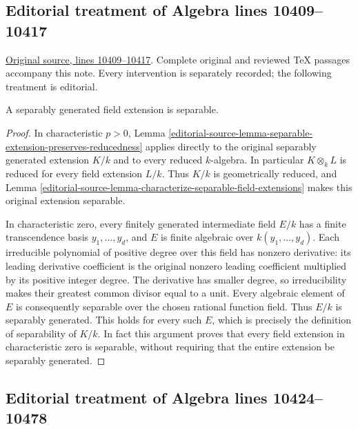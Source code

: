 \subsection{Editorial treatment of Algebra lines 10409--10417}

\hypertarget{algebra-context-122}{}

\noindent\href{https://github.com/stacks/stacks-project/blob/a04446e57ec1fbc252a871afcec7752fb2807b14/algebra.tex\#L10409}{Original source, lines 10409--10417}. Complete original and reviewed TeX passages accompany this note. Every intervention is separately recorded; the following treatment is editorial.


\begin{lemma}
\label{editorial-source-lemma-separably-generated-separable}
A separably generated field extension is separable.
\end{lemma}

\begin{proof}
In characteristic $p>0$, Lemma
\ref{editorial-source-lemma-separable-extension-preserves-reducedness}
applies directly to the original separably generated
extension $K/k$ and to every reduced $k$-algebra.
In particular $K\otimes_k L$ is reduced for every
field extension $L/k$. Thus $K/k$ is geometrically
reduced, and Lemma
\ref{editorial-source-lemma-characterize-separable-field-extensions}
makes this original extension separable.

In characteristic zero, every finitely generated
intermediate field $E/k$ has a finite transcendence
basis $y_1,\ldots,y_d$, and $E$ is finite algebraic
over $k(y_1,\ldots,y_d)$. Each irreducible polynomial
of positive degree over this field has nonzero
derivative: its leading derivative coefficient is
the original nonzero leading coefficient multiplied
by its positive integer degree. The derivative has
smaller degree, so irreducibility makes their greatest
common divisor equal to a unit. Every algebraic
element of $E$ is consequently separable over the
chosen rational function field. Thus $E/k$ is
separably generated. This holds for every such $E$,
which is precisely the definition of separability
of $K/k$. In fact this argument proves that every
field extension in characteristic zero is separable,
without requiring that the entire extension be
separably generated.
\end{proof}


\subsection{Editorial treatment of Algebra lines 10424--10478}

